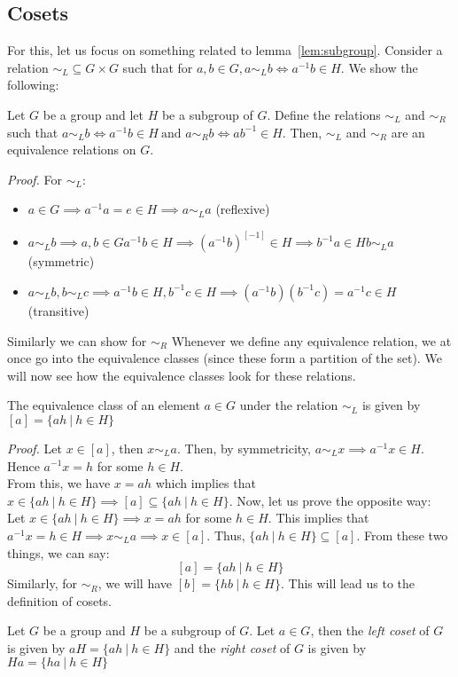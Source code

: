 \subsection{Cosets}
For this, let us focus on something related to lemma~\ref{lem:subgroup}. Consider a relation $\sim_L\subseteq G\times G$ such that for $a,b\in G, a\sim_Lb \iff a^{-1}b\in H$. We show the following:
\begin{proposition}
    Let $G$ be a group and let $H$ be a subgroup of $G$. Define the relations $\sim_L$ and $\sim_R$ such that $a\sim_L b \iff a^{-1}b\in H\ \text{and } a\sim_R b \iff ab^{-1}\in H$. Then, $\sim_L$ and $\sim_R$ are an equivalence relations on $G$. 
\end{proposition}
\textit{Proof.} For $\sim_L$:
\begin{itemize}
    \item $a\in G \implies a^{-1}a = e \in H\implies a\sim_L a$ (reflexive)
    \item $a\sim_Lb\implies a,b \in G a^{-1}b \in H \implies (a^{-1}b)^[-1]\in H \implies b^{-1}a\in H  b\sim_La$ (symmetric)
    \item $a\sim_Lb, b\sim_Lc\implies a^{-1}b\in H, b^{-1}c\in H\implies (a^{-1}b)(b^{-1}c)= a^{-1}c\in H$ (transitive)
\end{itemize}
Similarly we can show for $\sim_R$
Whenever we define any equivalence relation, we at once go into the equivalence classes (since these form a partition of the set). We will now see how the equivalence classes look for these relations.
\begin{lemma}
    The equivalence class of an element $a\in G$ under the relation $\sim_L$ is given by $[a] = \{ah\ |\ h\in H\}$
\end{lemma}
\textit{Proof.} Let $x\in [a]$, then $x\sim_L a$. Then, by symmetricity, $a\sim_L x\implies a^{-1}x\in H$. Hence $a^{-1}x = h$ for some $h\in H$. \\[0.3cm]
From this, we have $x = ah$ which implies that $x\in \{ah \ | \ h\in H\} \implies [a]\subseteq \{ah \ | \ h\in H\}$. Now, let us prove the opposite way:\\[0.3cm]
Let $x\in \{ah \ | \ h\in H\} \implies x = ah$ for some $h\in H$. This implies that $a^{-1}x = h \in H \implies x\sim_L a \implies x\in [a]$. Thus,  $\{ah \ | \ h\in H\} \subseteq [a]$. From these two things, we can say:
$$[a] = \{ah\ |\ h\in H\}$$
Similarly, for $\sim_R$, we will have $[b] = \{hb \ |\ h\in H\}$. This will lead us to the definition of cosets.
\begin{definition}[Cosets]
    Let $G$ be a group and $H$ be a subgroup of $G$. Let $a\in G$, then the \textit{left coset} of $G$ is given by $aH = \{ah \ | \ h\in H\}$ and the \textit{right coset} of $G$ is given by $Ha = \{ha \ | \ h\in H\}$
\end{definition}